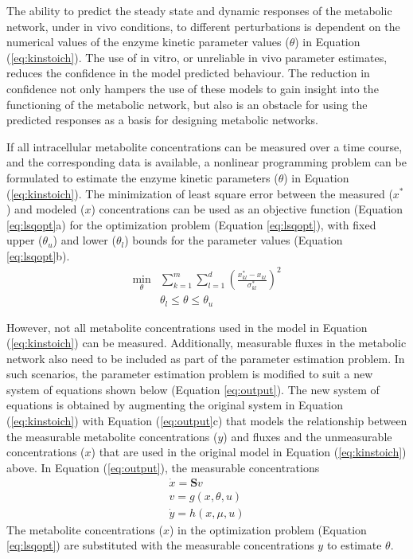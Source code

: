 \documentclass[10pt]{article}
\begin{document}
The ability to predict the steady state and dynamic responses of the metabolic network, under in vivo conditions, to different perturbations is dependent on the numerical values of the enzyme kinetic parameter values ($\theta$) in Equation (\ref{eq:kinstoich}). The use of in vitro, or unreliable in vivo parameter estimates, reduces the confidence in the model predicted behaviour. The reduction in confidence not only hampers the use of these models to gain insight into the functioning of the metabolic network, but also is an obstacle for using the predicted responses as a basis for designing metabolic networks.  

If all intracellular metabolite concentrations can be measured over a time course, and the corresponding data is available, a nonlinear programming problem can be formulated to estimate the enzyme kinetic parameters ($\theta$) in Equation (\ref{eq:kinstoich}). The minimization of least square error between the measured ($x^*$) and modeled ($x$) concentrations can be used as an objective function (Equation \ref{eq:lsqopt}a) for the optimization problem (Equation \ref{eq:lsqopt}), with fixed upper ($\theta_u$) and lower ($\theta_l$) bounds for the parameter values (Equation \ref{eq:lsqopt}b).
\begin{subequations}\label{eq:lsqopt}
	\begin{align}
	\underset{\theta}{\mathrm{min}} &\sum_{k=1}^{m}\sum_{l=1}^{d}\left(\frac{x_{kl}^*-x_{kl}}{\sigma_{kl}^*}\right)^2\\
	&\theta_l \le \theta \le \theta_u
	\end{align}
\end{subequations}

However, not all metabolite concentrations used in the model in Equation (\ref{eq:kinstoich}) can be measured. Additionally, measurable fluxes in the metabolic network also need to be included as part of the parameter estimation problem. In such scenarios, the parameter estimation problem is modified to suit a new system of equations shown below (Equation \ref{eq:output}). The new system of equations is obtained by augmenting the original system in Equation (\ref{eq:kinstoich}) with Equation (\ref{eq:output}c) that models the relationship between the measurable metabolite concentrations ($y$) and fluxes  and the unmeasurable concentrations ($x$) that are used in the original model in Equation (\ref{eq:kinstoich}) above. In Equation (\ref{eq:output}), the measurable concentrations 
\begin{subequations}\label{eq:output}
	\begin{align}
	\dot{x} = \mathbf{S}v\\
	v = g(x, \theta, u)\\
	\dot{y} = h(x, \mu, u)
	\end{align}
\end{subequations}
The metabolite concentrations ($x$) in the optimization problem (Equation \ref{eq:lsqopt}) are substituted with the measurable concentrations $y$ to estimate $\theta$. 
\end{document}
